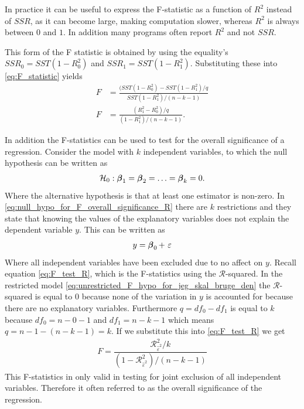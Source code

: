 In practice it can be useful to express the F-statistic as a function of $R^2$ instead of $SSR$, as it can become large, making computation slower, whereas $R^2$ is always between $0$ and $1$. In addition many programs often report $R^2$ and not $SSR$.

This form of the F statistic is obtained by using the equality's $SSR_0 = SST(1 - R^2_0)$ and $SSR_1 = SST(1-R^2_1)$. Substituting these into \eqref{eq:F_statistic} yields
\begin{align}\label{eq:F_test_R}
    F &= \frac{(SST(1 - R^2_0) - SST(1-R^2_1)/q}{SST(1-R^2_1)/(n-k-1)} \nonumber \\
    F &= \frac{(R^2_1 - R^2_0)/q}{(1 - R^2_1)/(n-k-1)}.
\end{align}

In addition the F-statistics can be used to test for the overall significance of a regression. Consider the model with $k$ independent variables, to which the null hypothesis can be written as
\begin{align}\label{eq:null_hypo_for_F_overall_significance_R}
    \mathcal{H}_0: \operatorname{\boldsymbol{\beta}}_1 = \operatorname{\boldsymbol{\beta}}_2 = \ldots = \operatorname{\boldsymbol{\beta}}_k = 0.
\end{align}
Where the alternative hypothesis is that at least one estimator is non-zero. In \eqref{eq:null_hypo_for_F_overall_significance_R} there are $k$ restrictions and they state that knowing the values of the explanatory variables does not explain the dependent variable $y$. This can be written as
\begin{align}\label{eq:unrestricted_F_hypo_for_jeg_skal_bruge_den}
    y = \operatorname{\boldsymbol{\beta}}_0 + \ \varepsilon
\end{align}
Where all independent variables have been excluded due to no affect on $y$. 
Recall equation \eqref{eq:F_test_R}, which is the F-statistics using the $\mathcal{R}$-squared. 
In the restricted model \eqref{eq:unrestricted_F_hypo_for_jeg_skal_bruge_den} the $\mathcal{R}$-squared is equal to $0$ because none of the variation in $y$ is accounted for because there are no explanatory variables. 
Furthermore $q = df_0 - df_{1}$ is equal to $k$ because $df_0 = n-0-1$ and $df_{1} = n-k-1$ which means $q = n-1 - (n-k-1) = k$. If we substitute this into \eqref{eq:F_test_R} we get
\begin{align}\label{eq:udvidelse_til_F_stat}
    F = \dfrac{\mathcal{R}^2_{\hat{\varepsilon}^2}/k}{(1-\mathcal{R}^2_{\hat{\varepsilon}^2}) / (n-k-1)}
\end{align}
This F-statistics in only valid in testing for joint exclusion of all independent variables. 
Therefore it often referred to as the overall significance of the regression. 

